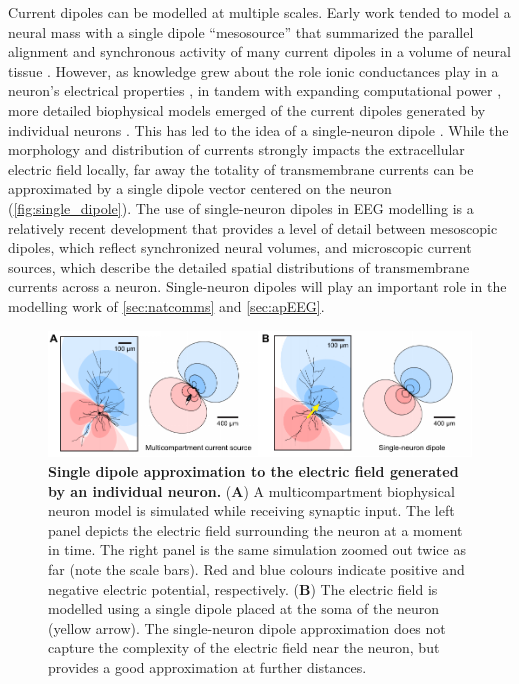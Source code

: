 Current dipoles can be modelled at multiple scales. Early work tended to model a neural mass with a single dipole ``mesosource'' that summarized the parallel alignment and synchronous activity of many current dipoles in a volume of neural tissue \cite{Nunez2006}. However, as knowledge grew about the role ionic conductances play in a neuron's electrical properties \cite{Baxter1991}, in tandem with expanding computational power \cite{Beeman2013}, more detailed biophysical models emerged of the current dipoles generated by individual neurons \cite{Murakami2002, Murakami2003 ,Murakami2006, Jones2007}. This has led to the idea of a single-neuron dipole \cite{Næss2021,Pettersen2012}. While the morphology and distribution of currents strongly impacts the extracellular electric field locally, far away the totality of transmembrane currents can be approximated by a single dipole vector centered on the neuron (\autoref{fig:single_dipole}). The use of single-neuron dipoles in EEG modelling is a relatively recent development that provides a level of detail between mesoscopic dipoles, which reflect synchronized neural volumes, and microscopic current sources, which describe the detailed spatial distributions of transmembrane currents across a neuron. Single-neuron dipoles will play an important role in the modelling work of \autoref{sec:natcomms} and \autoref{sec:apEEG}.


\begin{figure}[b!]
    \centering
    \includegraphics[width=\textwidth]{Figures/chapter1/single_neuron_dipole.pdf}
    
    \caption{\textbf{Single dipole approximation to the electric field generated by an individual neuron.} 
    (\textbf{A}) A multicompartment biophysical neuron model is simulated while receiving synaptic input. The left panel depicts the electric field surrounding the neuron at a moment in time. The right panel is the same simulation zoomed out twice as far (note the scale bars). Red and blue colours indicate positive and negative electric potential, respectively. (\textbf{B}) The electric field is modelled using a single dipole placed at the soma of the neuron (yellow arrow). The single-neuron dipole approximation does not capture the complexity of the electric field near the neuron, but provides a good approximation at further distances.} 
    \label{fig:single_dipole}
\end{figure}

